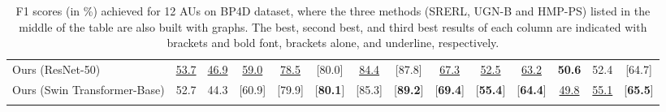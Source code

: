 \documentclass{article}
\begin{document}
\begin{table*}[thb]
{\begin{tabular}{lccccccccccccc}
        \rowcolor{gray!30}

        Ours (ResNet-50)           &\underline{53.7}      &\underline{46.9}      &\underline{59.0}      &\underline{78.5}       &[80.0]       &\underline{84.4}      &[87.8]       &\underline{67.3}       &\underline{52.5}   &\underline{63.2}   &\textbf{50.6}  &52.4  &[64.7]     \\\rowcolor{gray!30}
        Ours (Swin Transformer-Base)              &52.7  &44.3  &[60.9]  & [79.9]   &[\textbf{80.1}]   &[85.3]  &[\textbf{89.2}]   &[\textbf{69.4}]   &[\textbf{55.4}]  &[\textbf{64.4}]  &\underline{49.8}  &\underline{55.1}  &[\textbf{65.5}]  \\
        \Xhline{3\arrayrulewidth}
        \end{tabular}}

    \caption{F1 scores (in \%) achieved for 12 AUs on BP4D dataset, where the three methods (SRERL, UGN-B and HMP-PS) listed in the middle of the table are also built with graphs. The best, second best, and third best results of each column are indicated with brackets and bold font, brackets alone, and underline, respectively.
    }
    \label{ex:tab_BP4D_sota}
\end{table*}
\end{document}
